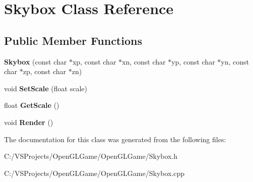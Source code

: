 \hypertarget{class_skybox}{\section{Skybox Class Reference}
\label{class_skybox}
}
\subsection*{Public Member Functions}
\begin{DoxyCompactItemize}
\item 
\hypertarget{class_skybox_a42cfbdc08b3e48cfc56f952cb3a345a6}{{\bfseries Skybox} (const char $\ast$xp, const char $\ast$xn, const char $\ast$yp, const char $\ast$yn, const char $\ast$zp, const char $\ast$zn)}\label{class_skybox_a42cfbdc08b3e48cfc56f952cb3a345a6}

\item 
\hypertarget{class_skybox_a9de573bdb20a6313942ed86db238de6d}{void {\bfseries Set\-Scale} (float scale)}\label{class_skybox_a9de573bdb20a6313942ed86db238de6d}

\item 
\hypertarget{class_skybox_aa73d6d175c7c2ff48c26f907b01ba982}{float {\bfseries Get\-Scale} ()}\label{class_skybox_aa73d6d175c7c2ff48c26f907b01ba982}

\item 
\hypertarget{class_skybox_ad995eb02031eefdf7e8f126848579418}{void {\bfseries Render} ()}\label{class_skybox_ad995eb02031eefdf7e8f126848579418}

\end{DoxyCompactItemize}


The documentation for this class was generated from the following files\-:\begin{DoxyCompactItemize}
\item 
C\-:/\-V\-S\-Projects/\-Open\-G\-L\-Game/\-Open\-G\-L\-Game/Skybox.\-h\item 
C\-:/\-V\-S\-Projects/\-Open\-G\-L\-Game/\-Open\-G\-L\-Game/Skybox.\-cpp\end{DoxyCompactItemize}
